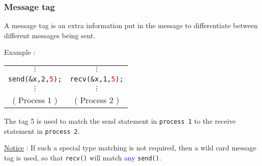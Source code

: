 \documentclass{beamer}
\begin{document}
\begin{frame}
\frametitle{Message tag}

A \alert{message tag} is an extra information put in the message to 
differentiate between different messages being sent.

Example :

\begin{center}
\begin{tabular}{c|c}
$\vdots$ & $\vdots$ \\
\texttt{send(\&x,2,\textcolor{red}{5});} & \texttt{recv(\&x,1,\textcolor{red}{5});} \\
$\vdots$ & $\vdots$ \\ \hline
( Process 1 ) & ( Process 2 )
\end{tabular}
\end{center}

The tag 5 is used to match the send statement in \texttt{process 1} to the receive statement in \texttt{process 2}.

\underline{Notice} : If such a special type matching is not required, then a
\alert{wild card} message tag is used, so that \texttt{recv()} will match
\textcolor{blue}{any} \texttt{send()}.
\end{frame}
\end{document}
